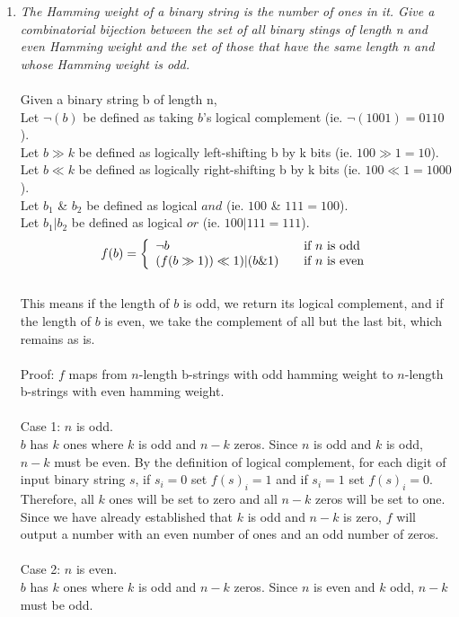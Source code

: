 \documentclass[12pt]{article}
\begin{document}
\begin{enumerate}
\item \emph{The Hamming weight of a binary string is the number of ones in it.
Give a combinatorial bijection between the set of all binary stings of
length n and even Hamming weight and the set of those that have the
same length n and whose Hamming weight is odd.} \\
\\
Given a binary string b of length n, \\
Let $\neg(b)$ be defined as taking $b$'s logical complement (ie. $\neg(1001) = 0110$). \\
Let $b \gg k$ be defined as logically left-shifting b by k bits (ie. $100 \gg 1 = 10$). \\
Let $b \ll k$ be defined as logically right-shifting b by k bits (ie. $100 \ll 1 = 1000$). \\
Let $b_1$ \& $b_2$ be defined as logical $and$ (ie. $100$ \& $111 = 100$). \\
Let $b_1 | b_2$ be defined as logical $or$ (ie. $100 | 111 = 111$). \\
\[ f(b) = \left\{ 
  \begin{array}{l l}
    \neg b & \quad \text{if $n$ is odd}\\
    (f(b \gg 1))\ll1)|(b \& 1) & \quad \text{if $n$ is even}
  \end{array} \right.\]
\\
This means if the length of $b$ is odd, we return its logical complement, and if the length of $b$ is even, we take the complement of all but the last bit, which remains as is. \\ 
\\
Proof: $f$ maps from $n$-length b-strings with odd hamming weight to $n$-length b-strings with even hamming weight. \\
\\
Case 1: $n$ is odd. \\
$b$ has $k$ ones where $k$ is odd and $n-k$ zeros. Since $n$ is odd and $k$ is odd, $n-k$ must be even. By the definition of logical complement, for each digit of input binary string $s$, if $s_i = 0$ set $f(s)_i = 1$ and if $s_i = 1$ set $f(s)_i = 0$. Therefore, all $k$ ones will be set to zero and all $n-k$ zeros will be set to one. Since we have already established that $k$ is odd and $n-k$ is zero, $f$ will output a number with an even number of ones and an odd number of zeros. \\
\\
Case 2: $n$ is even. \\
$b$ has $k$ ones where $k$ is odd and $n-k$ zeros. Since $n$ is even and $k$ odd, $n-k$ must be odd. \\

\end{enumerate}
\end{document}
